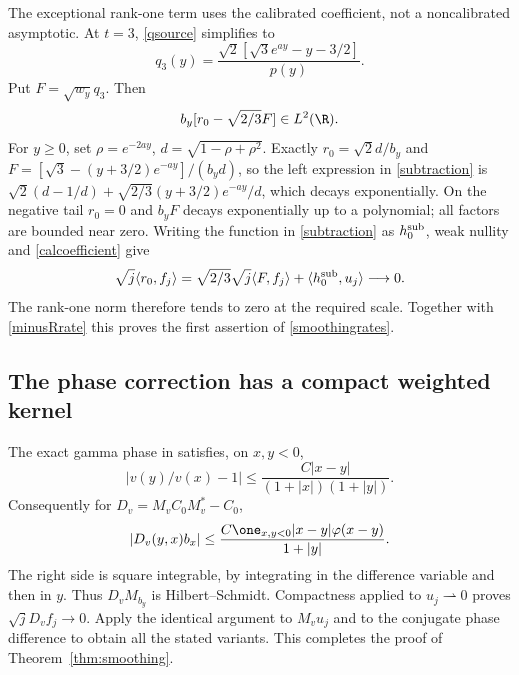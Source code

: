 The exceptional rank-one term uses the calibrated coefficient,
not a noncalibrated asymptotic. At $t=3$, \eqref{qsource} simplifies to
\begin{equation}\label{q3simple}
 q_3(y)=\frac{\sqrt2[\sqrt3e^{ay}-y-3/2]}{p(y)}.
\end{equation}
Put $F=\sqrt{w_y}q_3$. Then
\begin{equation}\label{subtraction}
 b_y[r_0-\sqrt{2/3}F]\in L^2(\R).
\end{equation}
For $y\ge0$, set $\rho=e^{-2ay}$, $d=\sqrt{1-\rho+\rho^2}$.
Exactly $r_0=\sqrt2d/b_y$ and
$F=[\sqrt3-(y+3/2)e^{-ay}]/(b_yd)$, so the left expression in
\eqref{subtraction} is
$\sqrt2(d-1/d)+\sqrt{2/3}(y+3/2)e^{-ay}/d$, which decays
exponentially. On the negative tail $r_0=0$ and $b_yF$ decays
exponentially up to a polynomial; all factors are bounded near zero.
Writing the function in \eqref{subtraction} as $h_0^{\rm sub}$,
weak nullity and \eqref{calcoefficient} give
\[
 \sqrt j\langle r_0,f_j\rangle
 =\sqrt{2/3}\sqrt j\langle F,f_j\rangle
      +\langle h_0^{\rm sub},u_j\rangle\longrightarrow0.
\]
The rank-one norm therefore tends to zero at the required scale.
Together with \eqref{minusRrate} this proves the first assertion of
\eqref{smoothingrates}.

\subsection{The phase correction has a compact weighted kernel}
The exact gamma phase in \cite[Section 8]{r124} satisfies, on $x,y<0$,
\[
 |v(y)/v(x)-1|\le
     \frac{C|x-y|}{(1+|x|)(1+|y|)}.
\]
Consequently for $D_v=M_vC_0M_v^*-C_0$,
\[
 |D_v(y,x)b_x|\le
       \frac{C\one_{x,y<0}|x-y|\varphi(x-y)}{1+|y|}.
\]
The right side is square integrable, by integrating in the difference
variable and then in $y$. Thus $D_vM_{b_y}$ is Hilbert--Schmidt.
Compactness applied to $u_j\rightharpoonup0$ proves
$\sqrt jD_vf_j\to0$. Apply the identical argument to $M_vu_j$ and
to the conjugate phase difference to obtain all the stated variants.
This completes the proof of Theorem~\ref{thm:smoothing}.
